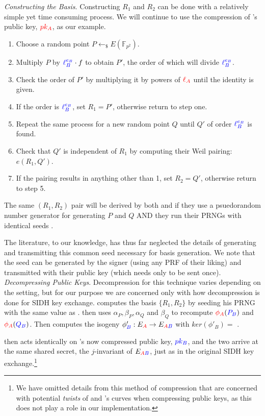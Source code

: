 \noindent
\textit{Constructing the Basis}. Constructing $R_1$ and $R_2$ can be done with a relatively simple yet time consuming process. We will continue to use the compression of \alice's public key, $\textcolor{red}{pk_A}$, as our example.
\begin{enumerate}
\item Choose a random point $P \leftarrow_{\$} E(\mathbb{F}_{p^2})$.
\item Multiply $P$ by $\textcolor{blue}{\ell_{B}^{e_B}} \cdot f$ to obtain $P'$, the order of which will divide $\textcolor{blue}{\ell_{B}^{e_B}}$.
\item Check the order of $P'$ by multiplying it by powers of $\textcolor{red}{\ell_{A}}$ until the identity is given.
\item If the order is $\textcolor{blue}{\ell_{B}^{e_B}}$, set $R_1 = P'$, otherwise return to step one.
\item Repeat the same process for a new random point $Q$ until $Q'$ of order $\textcolor{blue}{\ell_{B}^{e_B}}$ is found.
\item Check that $Q'$ is independent of $R_1$ by computing their Weil pairing: $e(R_1, Q')$.
\item If the pairing results in anything other than 1, set $R_2 = Q'$, otherwise return to step 5.
\end{enumerate}

The same $(R_1, R_2)$ pair will be derived by both \alice and \bob if they use a psuedorandom number generator for generating $P$ and $Q$ AND they run their PRNGs with identical seeds \cite{compwr}.

The literature, to our knowledge, has thus far neglected the details of generating and transmitting this common seed necessary for basis generation. We note that the seed can be generated by the signer (using any PRF of their liking) and transmitted with their public key (which needs only to be sent once).\\

\noindent
\textit{Decompressing Public Keys}. Decompression for this technique varies depending on the setting, but for our purpose we are concerned only with how decompression is done for SIDH key exchange. \bob computes the basis $\{R_1, R_2\}$ by seeding his PRNG with the same value as \alice. \bob then uses $\alpha_P, \beta_P, \alpha_Q$ and $\beta_Q$ to recompute $\textcolor{red}{\phi_A}(\textcolor{blue}{P_B})$ and $\textcolor{red}{\phi_A}(\textcolor{blue}{Q_B})$. Then \bob computes the isogeny $\phi'_{\textcolor{blue}{B}} : E_{\textcolor{red}{A}} \rightarrow E_{\textcolor{red}{A}\textcolor{blue}{B}}$ with $ker(\phi'_{B}) =$ \cite{compwr}.

\alice then acts identically on \bob's now compressed public key, $\textcolor{blue}{pk_B}$, and the two arrive at the same shared secret, the $j$-invariant of $E_{\textcolor{red}{A}\textcolor{blue}{B}}$, just as in the original SIDH key exchange.\footnote{We have omitted details from this method of compression that are concerned with potential \textit{twists} of \alice and \bob's curves when compressing public keys, as this does not play a role in our implementation. }

